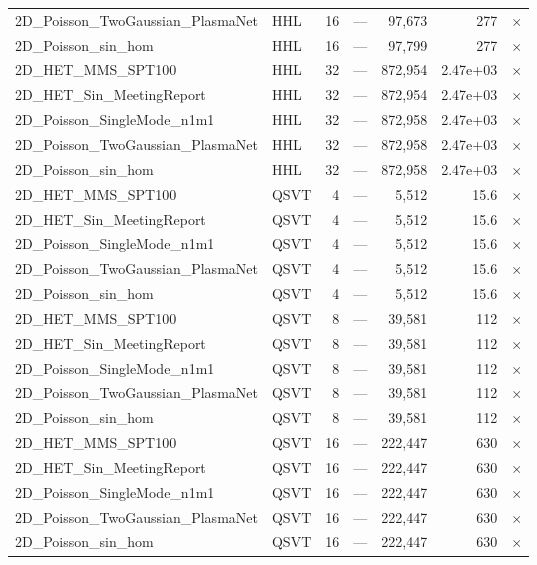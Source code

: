 \begin{table}[htbp]
\begin{tabular}{llrrrrl}
    2D\_Poisson\_TwoGaussian\_PlasmaNet & HHL & 16 & --- & 97,673 & 277 & $\times$ \\
    2D\_Poisson\_sin\_hom & HHL & 16 & --- & 97,799 & 277 & $\times$ \\
    2D\_HET\_MMS\_SPT100 & HHL & 32 & --- & 872,954 & 2.47e+03 & $\times$ \\
    2D\_HET\_Sin\_MeetingReport & HHL & 32 & --- & 872,954 & 2.47e+03 & $\times$ \\
    2D\_Poisson\_SingleMode\_n1m1 & HHL & 32 & --- & 872,958 & 2.47e+03 & $\times$ \\
    2D\_Poisson\_TwoGaussian\_PlasmaNet & HHL & 32 & --- & 872,958 & 2.47e+03 & $\times$ \\
    2D\_Poisson\_sin\_hom & HHL & 32 & --- & 872,958 & 2.47e+03 & $\times$ \\
    2D\_HET\_MMS\_SPT100 & QSVT & 4 & --- & 5,512 & 15.6 & $\times$ \\
    2D\_HET\_Sin\_MeetingReport & QSVT & 4 & --- & 5,512 & 15.6 & $\times$ \\
    2D\_Poisson\_SingleMode\_n1m1 & QSVT & 4 & --- & 5,512 & 15.6 & $\times$ \\
    2D\_Poisson\_TwoGaussian\_PlasmaNet & QSVT & 4 & --- & 5,512 & 15.6 & $\times$ \\
    2D\_Poisson\_sin\_hom & QSVT & 4 & --- & 5,512 & 15.6 & $\times$ \\
    2D\_HET\_MMS\_SPT100 & QSVT & 8 & --- & 39,581 & 112 & $\times$ \\
    2D\_HET\_Sin\_MeetingReport & QSVT & 8 & --- & 39,581 & 112 & $\times$ \\
    2D\_Poisson\_SingleMode\_n1m1 & QSVT & 8 & --- & 39,581 & 112 & $\times$ \\
    2D\_Poisson\_TwoGaussian\_PlasmaNet & QSVT & 8 & --- & 39,581 & 112 & $\times$ \\
    2D\_Poisson\_sin\_hom & QSVT & 8 & --- & 39,581 & 112 & $\times$ \\
    2D\_HET\_MMS\_SPT100 & QSVT & 16 & --- & 222,447 & 630 & $\times$ \\
    2D\_HET\_Sin\_MeetingReport & QSVT & 16 & --- & 222,447 & 630 & $\times$ \\
    2D\_Poisson\_SingleMode\_n1m1 & QSVT & 16 & --- & 222,447 & 630 & $\times$ \\
    2D\_Poisson\_TwoGaussian\_PlasmaNet & QSVT & 16 & --- & 222,447 & 630 & $\times$ \\
    2D\_Poisson\_sin\_hom & QSVT & 16 & --- & 222,447 & 630 & $\times$ \\

\end{tabular}
\end{table}
